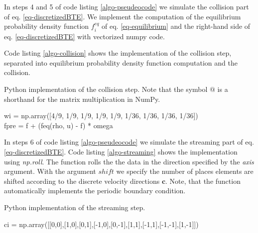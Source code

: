 \documentclass[a4paper,11pt, footsepline]{book}
\begin{document}
In steps 4 and 5 of code listing \ref{algo-pseudeocode} we simulate the collision part of eq. \ref{eq-discretizedBTE}. We implement the computation of the equilibrium probability density function $f_{i}^{eq}$ of eq. \ref{eq-equilibrium} and the right-hand side of eq. \ref{eq-discretizedBTE} with vectorized numpy code. 

Code listing \ref{algo-collision} shows the implementation of the collision step, separated into equilibrium probability density function computation and the collision.
\begin{algorithm}
 \caption{\label{algo-collision}Python implementation of the collision step. Note that the symbol $@$ is a shorthand for the matrix multiplication in NumPy.}
     \SetAlgoLined
     w\textunderscore i = np.array([4/9, 1/9, 1/9, 1/9, 1/9, 1/36, 1/36, 1/36, 1/36])\\
  f\textunderscore pre = f + (f\textunderscore eq(rho, u) - f) * omega
\end{algorithm}

In steps 6 of code listing \ref{algo-pseudeocode} we simulate the streaming part of eq. \ref{eq-discretizedBTE}. Code listing \ref{algo-streaming} shows the implementation using \textit{np.roll}.  The function rolls the the data in the direction specified by the \textit{axis} argument. With the argument $shift$ we specify the number of places elements are shifted according to the discrete velocity directions $\mathbf{c}$. Note, that the function automatically implements the periodic boundary condition.
\begin{algorithm}
 \caption{\label{algo-streaming}Python implementation of the streaming step.}
     \SetAlgoLined
     c\textunderscore i = np.array([[0,0],[1,0],[0,1],[-1,0],[0,-1],[1,1],[-1,1],[-1,-1],[1,-1]])\\
\end{algorithm}
\end{document}
